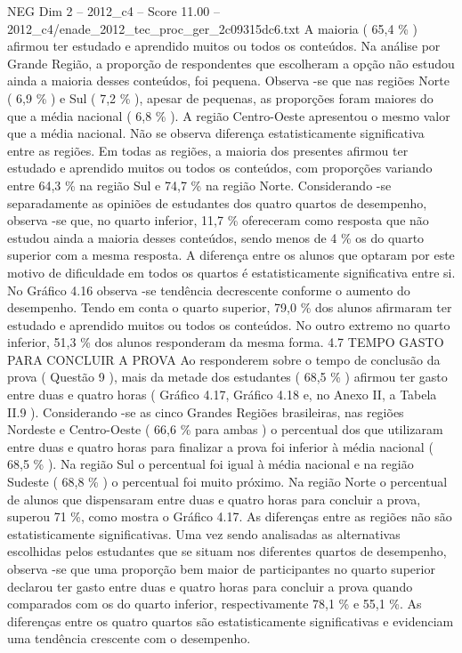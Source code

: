 \begin{textsample}{NEG Dim 2 – 2012\_c4 – Score 11.00 – 2012\_c4/enade\_2012\_tec\_proc\_ger\_2c09315dc6.txt}
A maioria ( 65,4 \% ) afirmou ter estudado e aprendido muitos ou todos os conteúdos.
Na análise por Grande Região, a proporção de respondentes que escolheram a opção não estudou ainda a maioria desses conteúdos, foi pequena.
Observa -se que nas regiões Norte ( 6,9 \% ) e Sul ( 7,2 \% ), apesar de pequenas, as proporções foram maiores do que a média nacional ( 6,8 \% ).
A região Centro-Oeste apresentou o mesmo valor que a média nacional.
Não se observa diferença estatisticamente significativa entre as regiões.
Em todas as regiões, a maioria dos presentes afirmou ter estudado e aprendido muitos ou todos os conteúdos, com proporções variando entre 64,3 \% na região Sul e 74,7 \% na região Norte.
Considerando -se separadamente as opiniões de estudantes dos quatro quartos de desempenho, observa -se que, no quarto inferior, 11,7 \% ofereceram como resposta que não estudou ainda a maioria desses conteúdos, sendo menos de 4 \% os do quarto superior com a mesma resposta.
A diferença entre os alunos que optaram por este motivo de dificuldade em todos os quartos é estatisticamente significativa entre si.
No Gráfico 4.16 observa -se tendência decrescente conforme o aumento do desempenho.
Tendo em conta o quarto superior, 79,0 \% dos alunos afirmaram ter estudado e aprendido muitos ou todos os conteúdos.
No outro extremo no quarto inferior, 51,3 \% dos alunos responderam da mesma forma. 4.7 TEMPO GASTO PARA CONCLUIR A PROVA Ao responderem sobre o tempo de conclusão da prova ( Questão 9 ), mais da metade dos estudantes ( 68,5 \% ) afirmou ter gasto entre duas e quatro horas ( Gráfico 4.17, Gráfico 4.18 e, no Anexo II, a Tabela II.9 ).
Considerando -se as cinco Grandes Regiões brasileiras, nas regiões Nordeste e Centro-Oeste ( 66,6 \% para ambas ) o percentual dos que utilizaram entre duas e quatro horas para finalizar a prova foi inferior à média nacional ( 68,5 \% ).
Na região Sul o percentual foi igual à média nacional e na região Sudeste ( 68,8 \% ) o percentual foi muito próximo.
Na região Norte o percentual de alunos que dispensaram entre duas e quatro horas para concluir a prova, superou 71 \%, como mostra o Gráfico 4.17.
As diferenças entre as regiões não são estatisticamente significativas.
Uma vez sendo analisadas as alternativas escolhidas pelos estudantes que se situam nos diferentes quartos de desempenho, observa -se que uma proporção bem maior de participantes no quarto superior declarou ter gasto entre duas e quatro horas para concluir a prova quando comparados com os do quarto inferior, respectivamente 78,1 \% e 55,1 \%.
As diferenças entre os quatro quartos são estatisticamente significativas e evidenciam uma tendência crescente com o desempenho.

\end{textsample}
